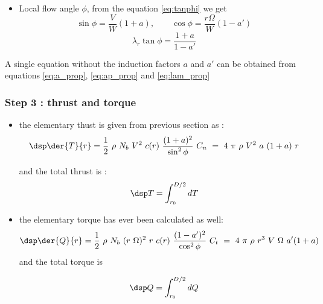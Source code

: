 \begin{itemize}
finally we find :


\begin{equation} \dsp 
  \dfrac{a'}{1-a'}  =   \dfrac{\sigma C_t}{4 \sin\phi \cos\phi} \qquad
  \Longrightarrow \qquad \dfrac{1}{a'} = \dfrac{4 \sin\phi \cos\phi}{\sigma C_t}+1 
\label{eq:ap_prop}\end{equation}  

\item Local flow angle $\phi$, from the equation \eqref{eq:tanphi} we get
$$\sin\phi = \dfrac{V}{W} (1+a), \qquad  \cos\phi = \dfrac{r \Omega}{W} (1-a')
$$
\begin{equation}\lambda_r \tan \phi = \dfrac{1+a}{1-a'} \label{eq:lam_prop}\end{equation}  

\end{itemize}

A single equation without the induction factors $a$ and $a'$ can be obtained from 
equations \eqref{eq:a_prop}, \eqref{eq:ap_prop} and  \eqref{eq:lam_prop}


\subsubsection{\sc Step 3 : thrust and torque}

\begin{itemize}
  \item the elementary thust is given from previous section as :
  $$ \dsp
   \der{T}{r} =  \dfrac{1}{2}~\rho~N_b~V^2~c(r)~\dfrac{(1+a)^2}{\sin^2\phi}~C_n~=~
   4 \ \pi \ \rho \ V^2 \ a \ (1+a) \ r
  $$
  
  and the total  thrust is :
  $$ \dsp
  T  = \int_{r_0}^{D/2} dT
  $$
  
  \item the elementary torque has ever been calculated  as well:
  $$\dsp
  \der{Q}{r} =  \dfrac{1}{2}~\rho~N_b~(r~\Omega)^2~r~c(r)~\dfrac{(1-a')^2}{\cos^2\phi}~C_t~=~
   4~\pi~\rho~r^3~V~\Omega~a'(1+a)
  $$
  and the total torque is 
  
  $$ \dsp
  Q  = \int_{r_0}^{D/2} dQ
  $$
  \end{itemize}

